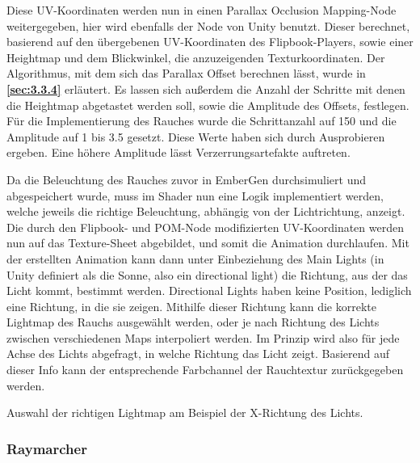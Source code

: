 Diese UV-Koordinaten werden nun in einen Parallax Occlusion Mapping-Node weitergegeben, hier wird ebenfalls der Node von
Unity benutzt. Dieser berechnet, basierend auf den übergebenen UV-Koordinaten des Flipbook-Players, sowie einer Heightmap und dem Blickwinkel, die anzuzeigenden Texturkoordinaten.
Der Algorithmus, mit dem sich das Parallax Offset berechnen lässt, wurde in \textbf{\autoref{sec:3.3.4}} erläutert.
Es lassen sich außerdem die Anzahl der Schritte mit denen die Heightmap abgetastet werden soll, sowie die Amplitude des Offsets, festlegen.
Für die Implementierung des Rauches wurde die Schrittanzahl auf 150 und die Amplitude auf 1 bis 3.5 gesetzt. Diese Werte haben sich durch Ausprobieren ergeben.
Eine höhere Amplitude lässt Verzerrungsartefakte auftreten.


Da die Beleuchtung des Rauches zuvor in EmberGen durchsimuliert und abgespeichert wurde, muss im Shader nun eine Logik implementiert werden, welche jeweils die richtige Beleuchtung,
abhängig von der Lichtrichtung, anzeigt. Die durch den Flipbook- und POM-Node modifizierten UV-Koordinaten werden nun auf das Texture-Sheet abgebildet, und somit die Animation durchlaufen.
Mit der erstellten Animation kann dann unter Einbeziehung des Main Lights (in Unity definiert als die Sonne, also ein directional light) die Richtung, aus der
das Licht kommt, bestimmt werden. Directional Lights haben keine Position, lediglich eine Richtung, in die sie zeigen. Mithilfe dieser Richtung kann die korrekte Lightmap
des Rauchs ausgewählt werden, oder je nach Richtung des Lichts zwischen verschiedenen Maps interpoliert werden. Im Prinzip wird also für jede Achse des Lichts abgefragt,
in welche Richtung das Licht zeigt. Basierend auf dieser Info kann der entsprechende Farbchannel der Rauchtextur zurückgegeben werden.


\begin{algorithm}
	\caption{Auswahl der richtigen Lightmap am Beispiel der X-Richtung des Lichts.}
	\label{alg:lightMapLogik}
	\begin{algorithmic}[1]

		\Else
		\EndIf
	\end{algorithmic}
\end{algorithm}

\subsubsection{Raymarcher}

